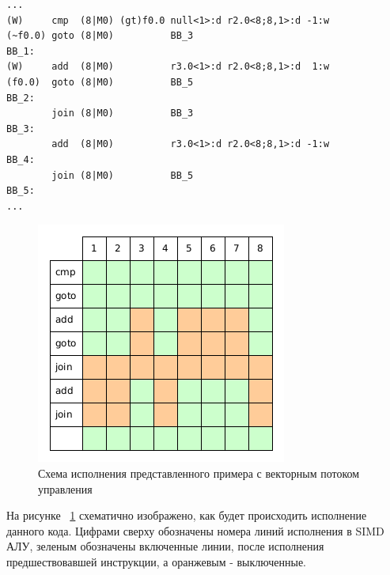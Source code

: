 \begin{verbatim}
...
(W)     cmp  (8|M0) (gt)f0.0 null<1>:d r2.0<8;8,1>:d -1:w
(~f0.0) goto (8|M0)          BB_3
BB_1:
(W)     add  (8|M0)          r3.0<1>:d r2.0<8;8,1>:d  1:w
(f0.0)  goto (8|M0)          BB_5
BB_2:
        join (8|M0)          BB_3
BB_3:
        add  (8|M0)          r3.0<1>:d r2.0<8;8,1>:d -1:w
BB_4:
        join (8|M0)          BB_5
BB_5:
...
\end{verbatim}

\begin{figure}[h]
  \centering
  \includegraphics[scale=0.60]{Images/HW-goto-example.png}
  \caption{Схема исполнения представленного примера с векторным потоком
  управления}
  \label{fig:HW-goto-example}
\end{figure}

На рисунке ~\ref{fig:HW-goto-example} схематично изображено, как будет
происходить исполнение данного кода. Цифрами сверху обозначены номера линий
исполнения в SIMD АЛУ, зеленым обозначены включенные линии, после исполнения
предшествовавшей инструкции, а оранжевым - выключенные.
